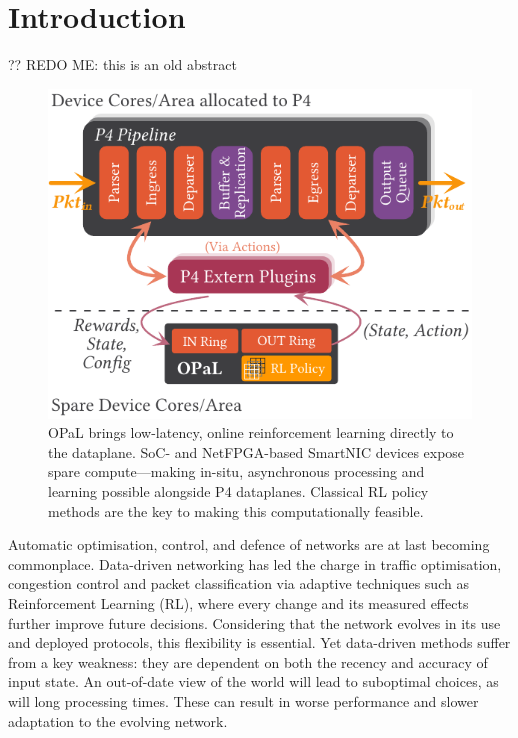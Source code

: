 \documentclass[sigconf,natbib=false]{acmart}
\newcommand{\approachshort}{OPaL}
\begin{document}
	
\maketitle

\setlength{\aweboxleftmargin}{0.12\linewidth}
\setlength{\aweboxcontentwidth}{1.97\linewidth}
	
\section{Introduction}
?? REDO ME: this is an old abstract

\begin{figure}
	\centering
	\includegraphics[keepaspectratio, width=0.9\linewidth]{figures/arch-with-p4}
	\caption{\approachshort{} brings low-latency, online reinforcement learning directly to the dataplane. SoC- and NetFPGA-based SmartNIC devices expose spare compute---making in-situ, asynchronous processing and learning possible alongside P4 dataplanes. Classical RL policy methods are the key to making this computationally feasible.\label{fig:netro-arch}}
\end{figure}

Automatic optimisation, control, and defence of networks are at last becoming commonplace. Data-driven networking has led the charge in traffic optimisation, congestion control and packet classification via adaptive techniques such as Reinforcement Learning (RL), where every change and its measured effects further improve future decisions. Considering that the network evolves in its use and deployed protocols, this flexibility is essential. Yet data-driven methods suffer from a key weakness: they are dependent on both the recency and accuracy of input state. An out-of-date view of the world will lead to suboptimal choices, as will long processing times. These can result in worse performance and slower adaptation to the evolving network.
\end{document}
